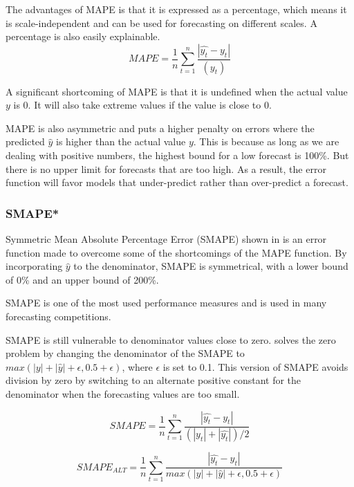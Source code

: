 The advantages of MAPE is that it is expressed as a percentage, which means
it is scale-independent and can be used for forecasting on different scales.
A percentage is also easily explainable.
\begin{equation}
  \label{eq:Mape}
  MAPE = \frac{1}{n} \sum_{t=1}^n \frac{|\hat{y_t} - y_t|}{(y_t)}
\end{equation}

A significant shortcoming of MAPE is that it is undefined when the actual value $y$ is 0.
It will also take extreme values if the value is close to 0.

MAPE is also asymmetric and puts a higher penalty on errors where the predicted
$\hat{y}$ is higher than the actual value $y$.
This is because as long as we are dealing with positive numbers,
the highest bound for a low forecast is 100\%. But there is no upper limit
for forecasts that are too high. As a result, the error function will
favor models that under-predict rather than over-predict a forecast.

\subsubsection{SMAPE*}
Symmetric Mean Absolute Percentage Error (SMAPE) shown in 
is an error function made to overcome some of the shortcomings of the MAPE function.
By incorporating $\hat{y}$ to the denominator, SMAPE is symmetrical,
with a lower bound of 0\% and an upper bound of 200\%.

SMAPE is one of the most used performance measures and is used in many forecasting competitions.

SMAPE is still vulnerable to denominator values close to zero.
\cite{Hewamalage2021} solves the zero problem by changing the denominator
of the SMAPE to $max(|y| + |\hat{y}| + \epsilon, 0.5 + \epsilon)$, where $\epsilon$
is set to 0.1.
This version of SMAPE avoids division by zero by switching to an alternate positive
constant for the denominator when the forecasting values are too small.


\begin{equation}
  \label{eq:sMape}
  SMAPE = \frac{1}{n} \sum_{t=1}^n \frac{|\hat{y_t} - y_t|}{(|y_t| + |\hat{y_t}|) / 2}
\end{equation}

\begin{equation}
  \label{eq:sMape-zero-division-alt}
  SMAPE_{ALT} = \frac{1}{n} \sum_{t=1}^n \frac{|\hat{y_t} - y_t|}{max(|y| + |\hat{y}| + \epsilon, 0.5 + \epsilon)}
\end{equation}

